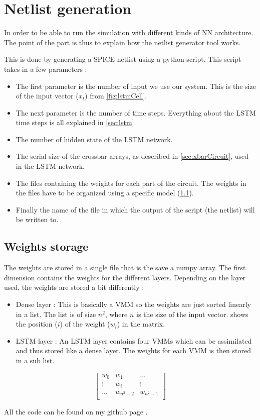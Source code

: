 \section{Netlist generation}
\label{sec:netlist}

In order to be able to run the simulation with different kinds of \ac{NN} architecture. The point of the part is thus to explain how the netlist generator tool works.

This is done by generating a SPICE netlist using a python script. This script takes in a few parameters :

\begin{itemize}
  \item The first parameter is the number of input we use our system. This is the size of the input vector ($x_t$) from \cref{fig:lstmCell}.
  \item The next parameter is the number of time steps. Everything about the \ac{LSTM} time steps is all explained in \cref{sec:lstm}.
  \item The number of hidden state of the \ac{LSTM} network.
  \item The serial size of the crossbar arrays, as described in \cref{sec:xbarCircuit}, used in the \ac{LSTM} network.
  \item The files containing the weights for each part of the circuit. The weights in the files have to be organized using a specific model (\cref{subsec:weiStore}).
  \item Finally the name of the file in which the output of the script (the netlist) will be written to.
\end{itemize}

\subsection{Weights storage}\label{subsec:weiStore}

The weights are stored in a single file that is the save a numpy array. The first dimension contains the weights for the different layers. Depending on the layer used, the weights are stored a bit differently :

\begin{itemize}
  \item Dense layer : This is basically a \ac{VMM} so the weights are just sorted linearly in a list. The list is of size $n^2$, where $n$ is the size of the input vector.  shows the position ($i$) of the weight ($w_i$) in the matrix.
  \item \ac{LSTM} layer : An \ac{LSTM} layer contains four \acp{VMM} which can be assimilated and thus stored like a dense layer. The weights for each \ac{VMM} is then stored in a sub list.
\end{itemize}

\begin{equation}\label{mtrx:wei}
  \begin{bmatrix}
    w_{0} & w_{1} & \dots \\
    \vdots & w_i & \vdots \\
    \dots & w_{n^2-2} & w_{n^2-1}\\
  \end{bmatrix}
\end{equation}

All the code can be found on my github page \cite{lstmGen}.
